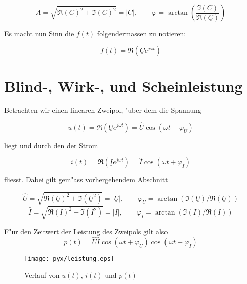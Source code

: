 \documentclass[german, 10pt, a4paper, headsepline]{scrreprt}
\theoremstyle{remark}
\begin{document}
\begin{displaymath}
	\hat{A} = \sqrt{\Re(\underline{C})^2+\Im(\underline{C})^2}=|\underline{C}|,\qquad \varphi = \arctan(\frac{\Im(\underline{C})}{\Re(\underline{C})})
\end{displaymath}

Es macht nun Sinn die $f(t)$ folgendermassen zu notieren:

\begin{displaymath}
	f(t) = \Re(\underline{C}e^{j\omega t})
\end{displaymath}


\section{Blind-, Wirk-, und Scheinleistung}

Betrachten wir einen linearen Zweipol, "uber dem die Spannung

\begin{displaymath}
	u(t)=\Re(\underline{U}e^{j\omega t})=\hat{U}\cos(\omega t+\varphi_U)
\end{displaymath}

liegt und durch den der Strom

\begin{displaymath}
	i(t) = \Re(\underline{I}e^{jwt})=\hat{I}\cos(\omega t+\varphi_I)
\end{displaymath}

fliesst. Dabei gilt gem"ass vorhergehendem Abschnitt

\begin{displaymath}
	\hat{U} = \sqrt{\Re(\underline{U})^2+\Im(\underline{U}^2)} = |\underline{U}|, \qquad \varphi_U =\arctan(\Im(\underline{U})/\Re(\underline{U}))
\end{displaymath}
\begin{displaymath}
	\hat{I} = \sqrt{\Re(\underline{I})^2+\Im(\underline{I}^2)} = |\underline{I}|, \qquad \varphi_I =\arctan(\Im(\underline{I})/\Re(\underline{I}))
\end{displaymath}

F"ur den Zeitwert der Leistung des Zweipols gilt also
\begin{displaymath}
	p(t) = \hat{U}\hat{I}\cos(\omega t+\varphi_U)\cos(\omega t+\varphi_I)
\end{displaymath}


\begin{figure}[hbt]
 \begin{center}
	\texttt{[image: pyx/leistung.eps]}
 \end{center}
 \label{verlauf_leistung}
 \caption{Verlauf von $u(t)$, $i(t)$ und $p(t)$}
\end{figure}
\end{document}
